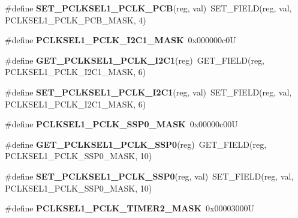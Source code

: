 \begin{DoxyCompactItemize}
\#define {\bfseries S\+E\+T\+\_\+\+P\+C\+L\+K\+S\+E\+L1\+\_\+\+P\+C\+L\+K\+\_\+\+P\+CB}(reg,  val)~S\+E\+T\+\_\+\+F\+I\+E\+LD(reg, val, P\+C\+L\+K\+S\+E\+L1\+\_\+\+P\+C\+L\+K\+\_\+\+P\+C\+B\+\_\+\+M\+A\+SK, 4)
\item 
\mbox{\label{group__lpc24xx__regs_gae2027a029487fda4881cf1ef0e364e80}} 
\#define {\bfseries P\+C\+L\+K\+S\+E\+L1\+\_\+\+P\+C\+L\+K\+\_\+\+I2\+C1\+\_\+\+M\+A\+SK}~0x000000c0U
\item 
\mbox{\label{group__lpc24xx__regs_ga0417a07a382b428d434a3532159a5723}} 
\#define {\bfseries G\+E\+T\+\_\+\+P\+C\+L\+K\+S\+E\+L1\+\_\+\+P\+C\+L\+K\+\_\+\+I2\+C1}(reg)~G\+E\+T\+\_\+\+F\+I\+E\+LD(reg, P\+C\+L\+K\+S\+E\+L1\+\_\+\+P\+C\+L\+K\+\_\+\+I2\+C1\+\_\+\+M\+A\+SK, 6)
\item 
\mbox{\label{group__lpc24xx__regs_gaf7e88752efe18c44e3ba767425669fab}} 
\#define {\bfseries S\+E\+T\+\_\+\+P\+C\+L\+K\+S\+E\+L1\+\_\+\+P\+C\+L\+K\+\_\+\+I2\+C1}(reg,  val)~S\+E\+T\+\_\+\+F\+I\+E\+LD(reg, val, P\+C\+L\+K\+S\+E\+L1\+\_\+\+P\+C\+L\+K\+\_\+\+I2\+C1\+\_\+\+M\+A\+SK, 6)
\item 
\mbox{\label{group__lpc24xx__regs_gaf1263d61e1713ca72621e7586635ec5f}} 
\#define {\bfseries P\+C\+L\+K\+S\+E\+L1\+\_\+\+P\+C\+L\+K\+\_\+\+S\+S\+P0\+\_\+\+M\+A\+SK}~0x00000c00U
\item 
\mbox{\label{group__lpc24xx__regs_ga2d4b40b13289e90675540d68c6d06f6c}} 
\#define {\bfseries G\+E\+T\+\_\+\+P\+C\+L\+K\+S\+E\+L1\+\_\+\+P\+C\+L\+K\+\_\+\+S\+S\+P0}(reg)~G\+E\+T\+\_\+\+F\+I\+E\+LD(reg, P\+C\+L\+K\+S\+E\+L1\+\_\+\+P\+C\+L\+K\+\_\+\+S\+S\+P0\+\_\+\+M\+A\+SK, 10)
\item 
\mbox{\label{group__lpc24xx__regs_ga7a332c93cf33895b970c5100d8291e7f}} 
\#define {\bfseries S\+E\+T\+\_\+\+P\+C\+L\+K\+S\+E\+L1\+\_\+\+P\+C\+L\+K\+\_\+\+S\+S\+P0}(reg,  val)~S\+E\+T\+\_\+\+F\+I\+E\+LD(reg, val, P\+C\+L\+K\+S\+E\+L1\+\_\+\+P\+C\+L\+K\+\_\+\+S\+S\+P0\+\_\+\+M\+A\+SK, 10)
\item 
\mbox{\label{group__lpc24xx__regs_ga469f0d165fcc400af9c52730de63fdfd}} 
\#define {\bfseries P\+C\+L\+K\+S\+E\+L1\+\_\+\+P\+C\+L\+K\+\_\+\+T\+I\+M\+E\+R2\+\_\+\+M\+A\+SK}~0x00003000U

\end{DoxyCompactItemize}
